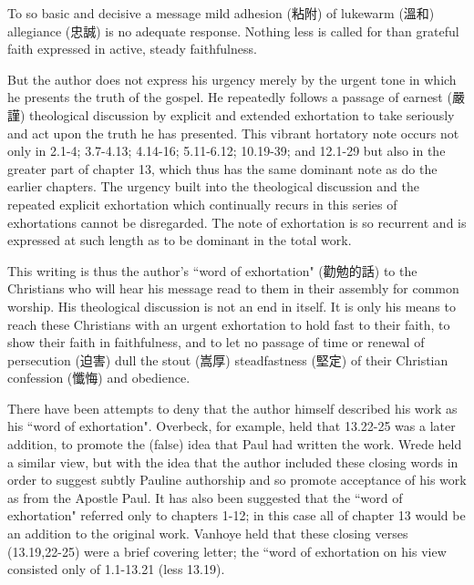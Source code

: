 To so basic and decisive a message mild adhesion (粘附) of lukewarm (溫和)
allegiance (忠誠) is no adequate response.
Nothing less is called for than grateful faith expressed in active, steady
faithfulness.
\newline

But the author does not express his urgency merely by the urgent tone in which
he presents the truth of the gospel.
He repeatedly follows a passage of earnest (嚴謹) theological discussion by
explicit and extended exhortation to take seriously and act upon the truth he
has presented.
This vibrant hortatory note occurs not only in 2.1-4; 3.7-4.13; 4.14-16;
5.11-6.12; 10.19-39; and 12.1-29 but also in the greater part of chapter 13,
which thus has the same dominant note as do the earlier chapters.
The urgency built into the theological discussion and the repeated explicit
exhortation which continually recurs in this series of exhortations cannot be
disregarded.
The note of exhortation is so recurrent and is expressed at such length as to
be dominant in the total work.
\newline

This writing is thus the author's ``word of exhortation" (勸勉的話) to the
Christians who will hear his message read to them in their assembly for common
worship.
His theological discussion is not an end in itself.
It is only his means to reach these Christians with an urgent exhortation to
hold fast to their faith, to show their faith in faithfulness, and to let no
passage of time or renewal of persecution (迫害) dull the stout (嵩厚)
steadfastness (堅定) of their Christian confession (懺悔) and obedience.
\newline

There have been attempts to deny that the author himself described his work as
his ``word of exhortation".
Overbeck, for example, held that 13.22-25 was a later addition, to promote the
(false) idea that Paul had written the work.
Wrede held a similar view, but with the idea that the author included these
closing words in order to suggest subtly Pauline authorship and so promote
acceptance of his work as from the Apostle Paul.
It has also been suggested that the ``word of exhortation" referred only to
chapters 1-12; in this case all of chapter 13 would be an addition to the
original work.
Vanhoye held that these closing verses (13.19,22-25) were a brief covering
letter; the ``word of exhortation on his view consisted only of 1.1-13.21
(less 13.19).
\newline

